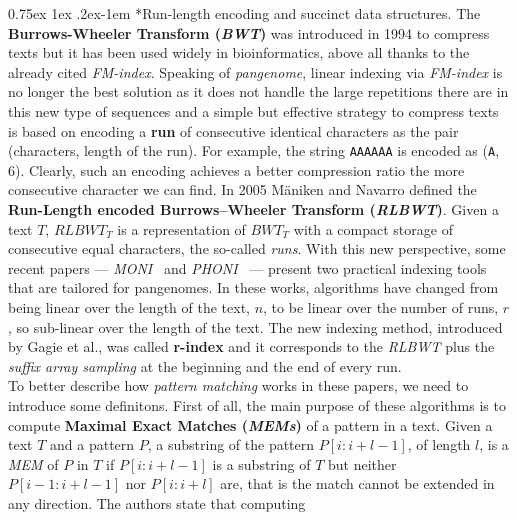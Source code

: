 \documentclass[a4paper,11pt, oneside]{article}
\makeatletter
\newcommand{\pb}[1]{\todo[backgroundcolor=red]{\textbf{PB} #1}}
\newcommand{\dc}[1]{\todo[backgroundcolor=yellow]{\textbf{DC} #1}}
\renewcommand{\paragraph}{%
  \@startsection{paragraph}{4}%
  {\z@}{0.75ex \@plus 1ex \@minus .2ex}{-1em}%
  {\normalfont\normalsize\bfseries}%
}
\makeatother
\begin{document}
\paragraph*{Run-length encoding and succinct data structures.}
\dc{Non so se parlare di LZ}
The \textbf{Burrows-Wheeler Transform (\textit{BWT})} was introduced
in 1994 to compress texts but it has been used widely
in bioinformatics, above all thanks to the already cited
\textit{FM-index}.
Speaking of \textit{pangenome}, linear indexing via \textit{FM-index} is no
longer the 
best solution as it does not handle the large repetitions there are in this new
type of sequences and a simple but effective strategy to compress texts is based
on encoding a \textbf{run} of consecutive identical characters as the pair
(characters, length of the run). For example, the string \texttt{AAAAAA} is
encoded as (\texttt{A}, 6). 
Clearly, such an encoding achieves a better compression ratio the more
consecutive character we can find. In 2005 M\"{a}niken and Navarro defined 
the \textbf{Run-Length encoded Burrows–Wheeler Transform
  (\textit{RLBWT})}. Given a text 
$T$, $RLBWT_T$ is a representation of $BWT_T$ with a compact storage of
consecutive equal characters, the so-called \textit{runs}. With this new
perspective, some recent papers --- \textit{MONI}~\cite{moni} and
\textit{PHONI}~\cite{phoni} --- present two practical indexing tools that are
tailored for pangenomes. In these works, algorithms have changed from being
linear over the length of the text, $n$, to be linear over the number of runs,
$r$, so sub-linear over the length of the text.
The new indexing method, introduced by Gagie et al., was called \textbf{r-index} 
and it corresponds to the \textit{RLBWT} plus the \textit{suffix array sampling}
at the beginning and the end of every run. \\
To better describe how \textit{pattern matching} works in these papers, we need
to introduce some definitons. First of all, the main purpose of these algorithms
is to compute \textbf{Maximal Exact Matches (\textit{MEMs})} of a pattern in a
text. Given a text $T$ and a pattern $P$, a substring of the pattern $P[i :
i+l-1]$, of length $l$, is a \textit{MEM} of $P$ in $T$ if $P[i:i+l-1]$ is a
substring of $T$ but neither $P[i-1:i+l-1]$ nor $P[i:i+l]$ are, that is the
match cannot be extended in any direction. The authors state that computing
\end{document}
